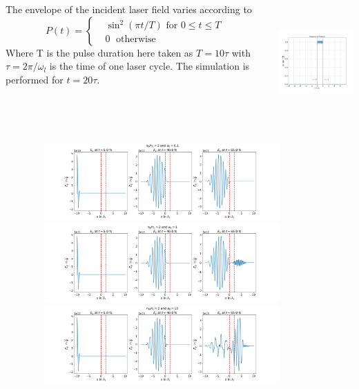 \documentclass{beamer}
\begin{document}
{\begin{frame}
    \small
    \begin{columns}
        \begin{column}{0.5\textwidth}
            The envelope of the incident laser field varies according to\cite{lichters}
            \begin{equation*}
                P(t)=
                \begin{cases}
                     & \sin^2(\pi t/T) \text{ for } 0 \leq t \le T \\
                     & 0         \;      \text{ otherwise }
                \end{cases}
            \end{equation*}
            Where T is the pulse duration here taken as $T=10\tau$ with $\tau = 2\pi/\omega_l$ is the time of one laser cycle. The simulation is performed for $t=20\tau$.
        \end{column}
        \begin{column}{0.5\textwidth}  %
            \includegraphics[width=6.5cm, height=4.5cm]{plasma.png}
        \end{column}
    \end{columns}
\end{frame}
\begin{frame}
    \includegraphics[width=12cm, height=3cm]{p1.png}
    \includegraphics[width=12cm, height=3cm]{p2.png}
    \includegraphics[width=12cm, height=3cm]{p3.png}

\end{frame}}
\end{document}
